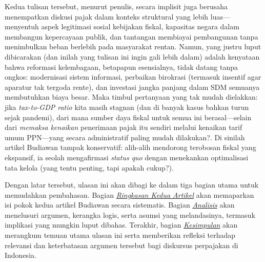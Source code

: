 Kedua tulisan tersebut, menurut penulis, secara implisit juga berusaha menempatkan diskusi pajak dalam konteks struktural yang lebih luas—menyentuh aspek legitimasi sosial kebijakan fiskal, kapasitas negara dalam membangun kepercayaan publik, dan tantangan membiayai pembangunan tanpa menimbulkan beban berlebih pada masyarakat rentan. Namun, yang justru luput dibicarakan (dan inilah yang tulisan ini ingin gali lebih dalam) adalah kenyataan bahwa reformasi kelembagaan, betapapun esensialnya, tidak datang tanpa ongkos: modernisasi sistem informasi, perbaikan birokrasi (termasuk insentif agar aparatur tak tergoda rente), dan investasi jangka panjang dalam SDM semuanya membutuhkan biaya besar. Maka timbul pertanyaan yang tak mudah dielakkan: jika \textit{tax-to-GDP ratio} kita masih stagnan (dan di banyak kasus bahkan turun sejak pandemi), dari mana sumber daya fiskal untuk semua ini berasal—selain dari \textit{memaksa kenaikan} penerimaan pajak itu sendiri melalui kenaikan tarif umum PPN—yang secara administratif paling mudah dilakukan?. Di sinilah artikel Budiawan tampak konservatif: alih-alih mendorong terobosan fiskal yang ekspansif, ia seolah mengafirmasi \textit{status quo} dengan menekankan optimalisasi tata kelola (yang tentu penting, tapi apakah cukup?).

Dengan latar tersebut, ulasan ini akan dibagi ke dalam tiga bagian utama untuk memudahkan pembahasan. Bagian \textit{\hyperref[sec:Ringkasan]{Ringkasan Kedua Artikel}} akan memaparkan isi pokok kedua artikel Budiawan secara sistematis. Bagian \textit{\hyperref[sec:Analisis & Evaluasi]{Analisis}} akan menelusuri argumen, kerangka logis, serta asumsi yang melandasinya, termasuk implikasi yang mungkin luput dibahas. Terakhir, bagian \textit{\hyperref[sec:Kesimpulan]{Kesimpulan}} akan merangkum temuan utama ulasan ini serta memberikan refleksi terhadap relevansi dan keterbatasan argumen tersebut bagi diskursus perpajakan di Indonesia.
\clearpage
